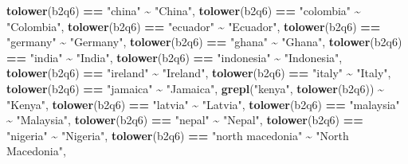 \documentclass[
]{article}
\newenvironment{Shaded}{\begin{snugshade}}{\end{snugshade}}
\newcommand{\FunctionTok}[1]{\textcolor[rgb]{0.13,0.29,0.53}{\textbf{#1}}}
\newcommand{\NormalTok}[1]{#1}
\newcommand{\SpecialCharTok}[1]{\textcolor[rgb]{0.81,0.36,0.00}{\textbf{#1}}}
\newcommand{\StringTok}[1]{\textcolor[rgb]{0.31,0.60,0.02}{#1}}
\begin{document}
\begin{Shaded}
\begin{Highlighting}[]
      \FunctionTok{tolower}\NormalTok{(b2q6) }\SpecialCharTok{==} \StringTok{"china"}           \SpecialCharTok{\textasciitilde{}} \StringTok{"China"}\NormalTok{,}
      \FunctionTok{tolower}\NormalTok{(b2q6) }\SpecialCharTok{==} \StringTok{"colombia"}        \SpecialCharTok{\textasciitilde{}} \StringTok{"Colombia"}\NormalTok{,}
      \FunctionTok{tolower}\NormalTok{(b2q6) }\SpecialCharTok{==} \StringTok{"ecuador"}         \SpecialCharTok{\textasciitilde{}} \StringTok{"Ecuador"}\NormalTok{,}
      \FunctionTok{tolower}\NormalTok{(b2q6) }\SpecialCharTok{==} \StringTok{"germany"}         \SpecialCharTok{\textasciitilde{}} \StringTok{"Germany"}\NormalTok{,}
      \FunctionTok{tolower}\NormalTok{(b2q6) }\SpecialCharTok{==} \StringTok{"ghana"}           \SpecialCharTok{\textasciitilde{}} \StringTok{"Ghana"}\NormalTok{,}
      \FunctionTok{tolower}\NormalTok{(b2q6) }\SpecialCharTok{==} \StringTok{"india"}           \SpecialCharTok{\textasciitilde{}} \StringTok{"India"}\NormalTok{,}
      \FunctionTok{tolower}\NormalTok{(b2q6) }\SpecialCharTok{==} \StringTok{"indonesia"}       \SpecialCharTok{\textasciitilde{}} \StringTok{"Indonesia"}\NormalTok{,}
      \FunctionTok{tolower}\NormalTok{(b2q6) }\SpecialCharTok{==} \StringTok{"ireland"}         \SpecialCharTok{\textasciitilde{}} \StringTok{"Ireland"}\NormalTok{,}
      \FunctionTok{tolower}\NormalTok{(b2q6) }\SpecialCharTok{==} \StringTok{"italy"}           \SpecialCharTok{\textasciitilde{}} \StringTok{"Italy"}\NormalTok{,}
      \FunctionTok{tolower}\NormalTok{(b2q6) }\SpecialCharTok{==} \StringTok{"jamaica"}         \SpecialCharTok{\textasciitilde{}} \StringTok{"Jamaica"}\NormalTok{,}
      \FunctionTok{grepl}\NormalTok{(}\StringTok{"kenya"}\NormalTok{, }\FunctionTok{tolower}\NormalTok{(b2q6))      }\SpecialCharTok{\textasciitilde{}} \StringTok{"Kenya"}\NormalTok{,}
      \FunctionTok{tolower}\NormalTok{(b2q6) }\SpecialCharTok{==} \StringTok{"latvia"}          \SpecialCharTok{\textasciitilde{}} \StringTok{"Latvia"}\NormalTok{,}
      \FunctionTok{tolower}\NormalTok{(b2q6) }\SpecialCharTok{==} \StringTok{"malaysia"}        \SpecialCharTok{\textasciitilde{}} \StringTok{"Malaysia"}\NormalTok{,}
      \FunctionTok{tolower}\NormalTok{(b2q6) }\SpecialCharTok{==} \StringTok{"nepal"}           \SpecialCharTok{\textasciitilde{}} \StringTok{"Nepal"}\NormalTok{,}
      \FunctionTok{tolower}\NormalTok{(b2q6) }\SpecialCharTok{==} \StringTok{"nigeria"}         \SpecialCharTok{\textasciitilde{}} \StringTok{"Nigeria"}\NormalTok{,}
      \FunctionTok{tolower}\NormalTok{(b2q6) }\SpecialCharTok{==} \StringTok{"north macedonia"} \SpecialCharTok{\textasciitilde{}} \StringTok{"North Macedonia"}\NormalTok{,}

\end{Highlighting}
\end{Shaded}
\end{document}
